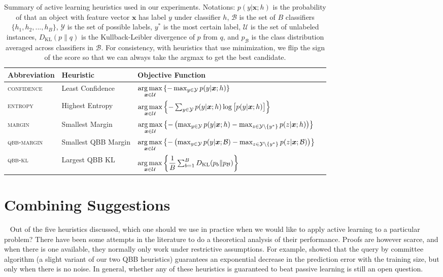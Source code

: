 \documentclass[fleqn,10pt,lineno]{wlpeerj} %
\newcommand{\B}{\mathcal{B}}
\newcommand{\Y}{\mathcal{Y}}
\newcommand{\Unlabeled}{\mathcal{U}}
\newcommand*{\argmax}{\operatornamewithlimits{arg\,max}\limits}
\begin{document}
\begin{table}[t]
	\caption {Summary of active learning heuristics used in our experiments.
			  Notations: $p(y | \bm{x}; h)$ is the probability of that an
			  object with feature vector $\bm{x}$ has label $y$ under
			  classifier $h$, $\B$ is the set of $B$ classifiers $\{h_1, h_2,
			  ..., h_B\}$, $\Y$ is the set of possible labels, $y^*$ is the
			  most certain label, $\Unlabeled$ is the set of unlabeled
			  instances, $D_{\mathrm{KL}}(p\|q)$ is the Kullback-Leibler
			  divergence of $p$ from $q$, and $p_\B$ is the class distribution
			  averaged across classifiers in $\B$. For consistency, with
			  heuristics that use minimization, we flip the sign of the score
			  so that we can always take the argmax to get the best candidate.}
	\label{tab:heuristics}
	\centering
	\begin{tabular}{llll}
		\toprule
		Abbreviation & {Heuristic}  &  Objective Function  \\
		\midrule
        \textsc{confidence} & Least Confidence &
			$\argmax_{\bm{x} \in \Unlabeled}
			\left\{ - \max_{y \in \Y} p(y | \bm{x}; h) \right\}$ \\
		\textsc{entropy} & Highest Entropy &
			$\argmax_{\bm{x} \in \Unlabeled} \left\{-\sum_{y \in \Y} p(y | \bm{x}; h)
            \log \big[ p(y | \bm{x}; h) \big] \right\}$
			\\[2ex]
		\textsc{margin} & Smallest Margin &
			$\argmax_{\bm{x} \in \Unlabeled} \left\{ - \left( \max_{y \in \Y} p(y | \bm{x}; h) -
            \max_{z \in \Y \setminus \{y^*\}} p(z | \bm{x}; h) \right) \right\}$
			\\[2ex]
		\textsc{qbb-margin} & Smallest QBB Margin &
			$\argmax_{\bm{x} \in \Unlabeled} \left\{ - \left( \max_{y \in \Y} p(y | \bm{x}; \B) -
            \max_{z \in \Y \setminus \{y^*\}} p(z | \bm{x}; \B) \right) \right\}$
			\\[2ex]
		\textsc{qbb-kl} & Largest QBB KL &
			$\argmax_{\bm{x} \in \Unlabeled} \left\{ \dfrac{1}{B}
               \sum_{b=1}^B D_{\mathrm{KL}}(p_b\|p_\B) \right\}$
			\\
		\bottomrule
	\end{tabular}
\end{table}

\section{Combining Suggestions}~\label{sec:expert}
Out of the five heuristics discussed, which one should we use in practice when
we would like to apply active learning to a particular problem? There have been
some attempts in the literature to do a theoretical analysis of their
performance. Proofs are however scarce, and when there is one available, they
normally only work under restrictive assumptions. For example, \cite{freund97}
showed that the query by committee algorithm (a slight variant of our two QBB
heuristics) guarantees an exponential decrease in the prediction error with the
training size, but only when there is no noise. In general, whether any of
these heuristics is guaranteed to beat passive learning is still an open
question.
\end{document}
